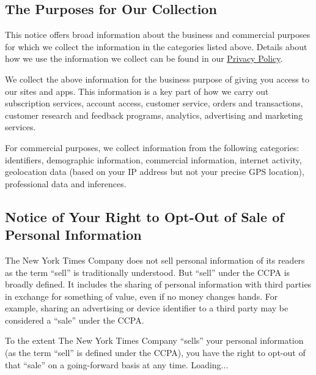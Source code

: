 \hypertarget{the-purposes-for-our-collection}{%
\subsection{The Purposes for Our
Collection}\label{the-purposes-for-our-collection}}

This notice offers broad information about the business and commercial
purposes for which we collect the information in the categories listed
above. Details about how we use the information we collect can be found
in our
\href{http://www.nytimes3xbfgragh.onion/privacy/privacy-policy\#what--do-we-do-with-the-information-we-gather}{Privacy
Policy}.

We collect the above information for the business purpose of giving you
access to our sites and apps. This information is a key part of how we
carry out subscription services, account access, customer service,
orders and transactions, customer research and feedback programs,
analytics, advertising and marketing services.

For commercial purposes, we collect information from the following
categories: identifiers, demographic information, commercial
information, internet activity, geolocation data (based on your IP
address but not your precise GPS location), professional data and
inferences.

\hypertarget{notice-of-your-right-to-opt-out-of-sale-of-personal-information}{%
\subsection{Notice of Your Right to Opt-Out of Sale of Personal
Information}\label{notice-of-your-right-to-opt-out-of-sale-of-personal-information}}

The New York Times Company does not sell personal information of its
readers as the term ``sell'' is traditionally understood. But ``sell''
under the CCPA is broadly defined. It includes the sharing of personal
information with third parties in exchange for something of value, even
if no money changes hands. For example, sharing an advertising or device
identifier to a third party may be considered a ``sale'' under the CCPA.

To the extent The New York Times Company ``sells'' your personal
information (as the term ``sell'' is defined under the CCPA), you have
the right to opt-out of that ``sale'' on a going-forward basis at any
time. Loading...

